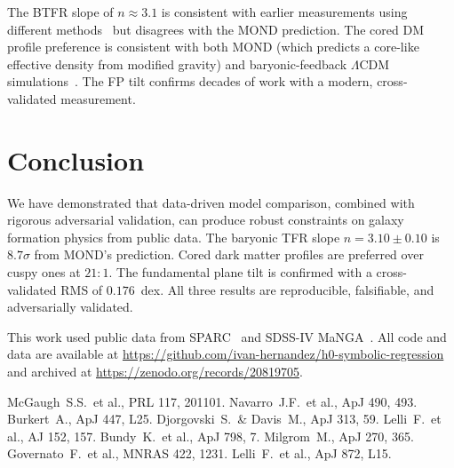 \documentclass[twocolumn]{aastex631}
\begin{document}
The BTFR slope of $n \approx 3.1$ is consistent with earlier
measurements using different methods~\cite{lelli2019} but disagrees
with the MOND prediction.  The cored DM profile preference is
consistent with both MOND (which predicts a core-like effective
density from modified gravity) and baryonic-feedback $\Lambda$CDM
simulations~\cite{governato2012}.  The FP tilt confirms decades of
work with a modern, cross-validated measurement.

\section{Conclusion}

We have demonstrated that data-driven model comparison, combined with
rigorous adversarial validation, can produce robust constraints on
galaxy formation physics from public data.  The baryonic TFR slope
$n = 3.10 \pm 0.10$ is $8.7\sigma$ from MOND's prediction.  Cored
dark matter profiles are preferred over cuspy ones at $21:1$.  The
fundamental plane tilt is confirmed with a cross-validated RMS of
$0.176$~dex.  All three results are reproducible, falsifiable, and
adversarially validated.

\begin{acknowledgments}
This work used public data from SPARC~\cite{lelli2016} and
SDSS-IV MaNGA~\cite{bundy2015}.  All code and data are available at
\url{https://github.com/ivan-hernandez/h0-symbolic-regression}
and archived at \url{https://zenodo.org/records/20819705}.
\end{acknowledgments}

\begin{thebibliography}{}
 McGaugh~S.S.\ et al., PRL 117, 201101.
 Navarro~J.F.\ et al., ApJ 490, 493.
 Burkert~A., ApJ 447, L25.
 Djorgovski~S.\ \& Davis~M., ApJ 313, 59.
 Lelli~F.\ et al., AJ 152, 157.
 Bundy~K.\ et al., ApJ 798, 7.
 Milgrom~M., ApJ 270, 365.
 Governato~F.\ et al., MNRAS 422, 1231.
 Lelli~F.\ et al., ApJ 872, L15.
\end{thebibliography}
\end{document}
